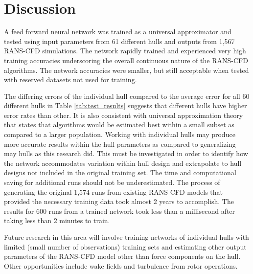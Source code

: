 \documentclass[twoside,twocolumn]{article}
\begin{document}
	
	\section{Discussion}
	
	A feed forward neural network was trained as a universal approximator and tested using input parameters from 61 different hulls and outputs from 1,567 RANS-CFD simulations. The network rapidly trained and experienced very high training accuracies underscoring the overall continuous nature of the RANS-CFD algorithms. The network accuracies were smaller, but still acceptable when tested with reserved datasets not used for training.

	The differing errors of the individual hull compared to the average error for all 60 different hulls in Table \ref{tab:test_results} suggests that different hulls have higher error rates than other. It is also consistent with universal approximation theory that states that algorithms would be estimated best within a small subset as compared to a larger population. Working with individual hulls may produce more accurate results within the hull parameters as compared to generalizing may hulls as this research did. This must be investigated in order to identify how the network accommodates variation within hull design and extrapolate to hull designs not included in the original training set.
	The time and computational saving for additional runs should not be underestimated. The process of generating the original 1,574 runs from existing RANS-CFD models that provided the necessary training data took almost 2 years to accomplish. The results for 600 runs from a trained network took less than a millisecond after taking less than 2 minutes to train.
	
	Future research in this area will involve training networks of individual hulls with limited (small number of observations) training sets and estimating other output parameters of the RANS-CFD model other than force components on the hull. Other opportunities include wake fields and turbulence from rotor operations. 
	
	
	{}
	
	
\end{document}
